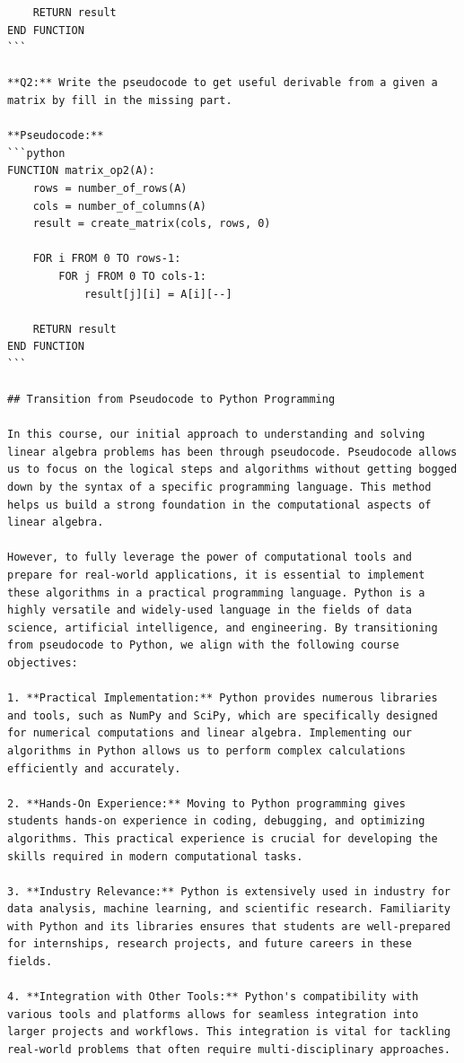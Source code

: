 \documentclass[
  letterpaper,
  DIV=11,
  numbers=noendperiod]{scrreprt}
\theoremstyle{plain}
\theoremstyle{definition}
\theoremstyle{remark}
\begin{document}
\begin{verbatim}
    RETURN result
END FUNCTION
```

**Q2:** Write the pseudocode to get useful derivable from a given a matrix by fill in the missing part.

**Pseudocode:**
```python
FUNCTION matrix_op2(A):
    rows = number_of_rows(A)
    cols = number_of_columns(A)
    result = create_matrix(cols, rows, 0)
    
    FOR i FROM 0 TO rows-1:
        FOR j FROM 0 TO cols-1:
            result[j][i] = A[i][--]
    
    RETURN result
END FUNCTION
```

## Transition from Pseudocode to Python Programming

In this course, our initial approach to understanding and solving linear algebra problems has been through pseudocode. Pseudocode allows us to focus on the logical steps and algorithms without getting bogged down by the syntax of a specific programming language. This method helps us build a strong foundation in the computational aspects of linear algebra.

However, to fully leverage the power of computational tools and prepare for real-world applications, it is essential to implement these algorithms in a practical programming language. Python is a highly versatile and widely-used language in the fields of data science, artificial intelligence, and engineering. By transitioning from pseudocode to Python, we align with the following course objectives:

1. **Practical Implementation:** Python provides numerous libraries and tools, such as NumPy and SciPy, which are specifically designed for numerical computations and linear algebra. Implementing our algorithms in Python allows us to perform complex calculations efficiently and accurately.

2. **Hands-On Experience:** Moving to Python programming gives students hands-on experience in coding, debugging, and optimizing algorithms. This practical experience is crucial for developing the skills required in modern computational tasks.

3. **Industry Relevance:** Python is extensively used in industry for data analysis, machine learning, and scientific research. Familiarity with Python and its libraries ensures that students are well-prepared for internships, research projects, and future careers in these fields.

4. **Integration with Other Tools:** Python's compatibility with various tools and platforms allows for seamless integration into larger projects and workflows. This integration is vital for tackling real-world problems that often require multi-disciplinary approaches.


\end{verbatim}
\end{document}
